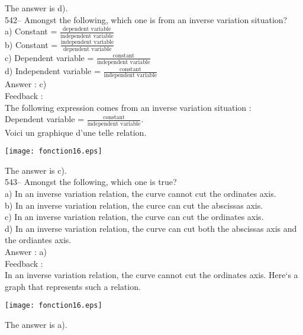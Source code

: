 \documentclass[letterpaper, 12pt]{article}
\begin{document}
The answer is d).\\


542-- Amongst the following, which one is from an inverse variation situation?\\[2mm]
a) Constant = $\frac{\textrm{dependent variable}}{\textrm{independent variable}}$\\[2mm]
b) Constant = $\frac{\textrm{independent variable}}{\textrm{dependent variable}}$\\[2mm]
c) Dependent variable = $\frac{\textrm{constant}}{\textrm{independent variable}}$\\[2mm]
d) Independent variable = $\frac{\textrm{constant}}{\textrm{independent variable}}$\\

Answer : c)\\

Feedback : \\
The following expression comes from an inverse variation situation :\\[2mm]
Dependent variable = $\frac{\textrm{constant}}{\textrm{independent variable}}$.\\[2mm]
Voici un graphique d'une telle relation.
    \begin{center}
    \texttt{[image: fonction16.eps]}
    \end{center}
The answer is c).\\

543-- Amongst the following, which one is true?\\
a) In an inverse variation relation, the curve cannot cut the ordinates axis.\\
b) In an inverse variation relation, the curce can cut the abscissas axis.\\
c) In an inverse variation relation, the curve can cut the ordinates axis.\\
d) In an inverse variation relation, the curve can cut both the abscissas axis and the ordiantes axis.\\

Answer : a)\\

Feedback : \\
In an inverse variation relation, the curve cannot cut the ordinates axis. Here`s a graph that represents such a relation.
    \begin{center}
    \texttt{[image: fonction16.eps]}
    \end{center}
The answer is a).\\
\end{document}

